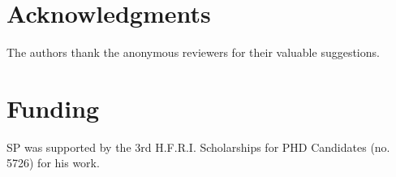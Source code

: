 \documentclass[unnumsec,webpdf,contemporary,large]{oup-authoring-template}%
\theoremstyle{thmstyleone}%
\theoremstyle{thmstyletwo}%
\theoremstyle{thmstylethree}%
\begin{document}
\section{Acknowledgments}
The authors thank the anonymous reviewers for their valuable suggestions.

\section{Funding}
SP was supported by the 3rd H.F.R.I. Scholarships for PHD Candidates (no. 5726) for his work.





%
%
\end{document}
